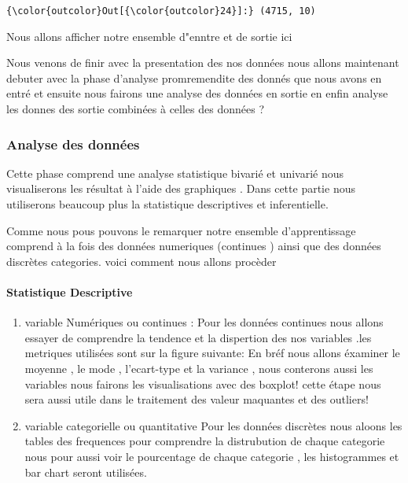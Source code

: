 \documentclass[11pt]{article}
\providecommand{\tightlist}{%
      \setlength{\itemsep}{0pt}\setlength{\parskip}{0pt}}
\begin{document}
            \begin{Verbatim}[commandchars=\\\{\}]
{\color{outcolor}Out[{\color{outcolor}24}]:} (4715, 10)
\end{Verbatim}
        
    Nous allons afficher notre ensemble d"enntre et de sortie ici

    Nous venons de finir avec la presentation des nos données nous allons
maintenant debuter avec la phase d'analyse promremendite des donnés que
nous avons en entré et ensuite nous fairons une analyse des données en
sortie en enfin analyse les donnes des sortie combinées à celles des
données ?

    \subsubsection{Analyse des données}\label{analyse-des-donnuxe9es}

    Cette phase comprend une analyse statistique bivarié et univarié nous
visualiserons les résultat à l'aide des graphiques . Dans cette partie
nous utiliserons beaucoup plus la statistique descriptives et
inferentielle.

    Comme nous pous pouvons le remarquer notre ensemble d'apprentissage
comprend à la fois des données numeriques (continues ) ainsi que des
données discrètes categories. voici comment nous allons procèder

    \paragraph{Statistique Descriptive}\label{statistique-descriptive}

    \begin{enumerate}
\def\labelenumi{\arabic{enumi}.}
\tightlist
\item
  variable Numériques ou continues : Pour les données continues nous
  allons essayer de comprendre la tendence et la dispertion des nos
  variables .les metriques utilisées sont sur la figure suivante: En
  bréf nous allons éxaminer le moyenne , le mode , l'ecart-type et la
  variance , nous conterons aussi les variables nous fairons les
  visualisations avec des boxplot! cette étape nous sera aussi utile
  dans le traitement des valeur maquantes et des outliers!
\item
  variable categorielle ou quantitative Pour les données discrètes nous
  aloons les tables des frequences pour comprendre la distrubution de
  chaque categorie nous pour aussi voir le pourcentage de chaque
  categorie , les histogrammes et bar chart seront utilisées.
\end{enumerate}
\end{document}
